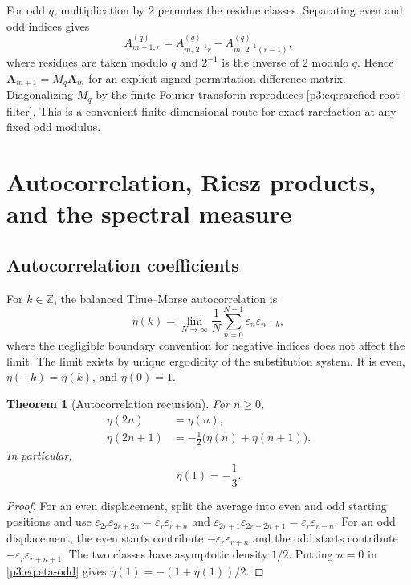 \documentclass[11pt,oneside]{article}
\newtheorem{theorem}{Theorem}[section]
\theoremstyle{definition}
\theoremstyle{remark}
\newcommand{\Z}{\mathbb Z}
\newcommand{\eps}{\varepsilon}
\begin{document}
For odd $q$, multiplication by $2$ permutes the residue classes.  Separating
even and odd indices gives
\begin{equation}\label{p3:eq:rarefied-matrix-recursion}
 A_{m+1,r}^{(q)}
 =A_{m,\,2^{-1}r}^{(q)}
  -A_{m,\,2^{-1}(r-1)}^{(q)},
\end{equation}
where residues are taken modulo $q$ and $2^{-1}$ is the inverse of $2$ modulo
$q$.  Hence $\mathbf A_{m+1}=M_q\mathbf A_m$ for an explicit signed
permutation-difference matrix.  Diagonalizing $M_q$ by the finite Fourier
transform reproduces \cref{p3:eq:rarefied-root-filter}.  This is a convenient
finite-dimensional route for exact rarefaction at any fixed odd modulus.

\section{Autocorrelation, Riesz products, and the spectral measure}

\subsection{Autocorrelation coefficients}

For $k\in\Z$, the balanced Thue--Morse autocorrelation is
\begin{equation}\label{p3:eq:autocorrelation-def}
 \eta(k)=\lim_{N\to\infty}\frac1N
 \sum_{n=0}^{N-1}\eps_n\eps_{n+k},
\end{equation}
where the negligible boundary convention for negative indices does not affect
the limit.  The limit exists by unique ergodicity of the substitution system.
It is even, $\eta(-k)=\eta(k)$, and $\eta(0)=1$.

\begin{theorem}[Autocorrelation recursion]\label{p3:thm:autocorrelation-recursion}
For $n\ge0$,
\begin{align}
 \eta(2n)&=\eta(n),\label{p3:eq:eta-even}\\
 \eta(2n+1)&=-\frac12\bigl(\eta(n)+\eta(n+1)\bigr).
 \label{p3:eq:eta-odd}
\end{align}
In particular,
\begin{equation}\label{p3:eq:eta-one}
 \eta(1)=-\frac13.
\end{equation}
\end{theorem}

\begin{proof}
For an even displacement, split the average into even and odd starting
positions and use
$\eps_{2r}\eps_{2r+2n}=\eps_r\eps_{r+n}$ and
$\eps_{2r+1}\eps_{2r+2n+1}=\eps_r\eps_{r+n}$.  For an odd displacement, the
even starts contribute $-\eps_r\eps_{r+n}$ and the odd starts contribute
$-\eps_r\eps_{r+n+1}$.  The two classes have asymptotic density $1/2$.
Putting $n=0$ in \cref{p3:eq:eta-odd} gives
$\eta(1)=-(1+\eta(1))/2$.
\end{proof}
\end{document}
